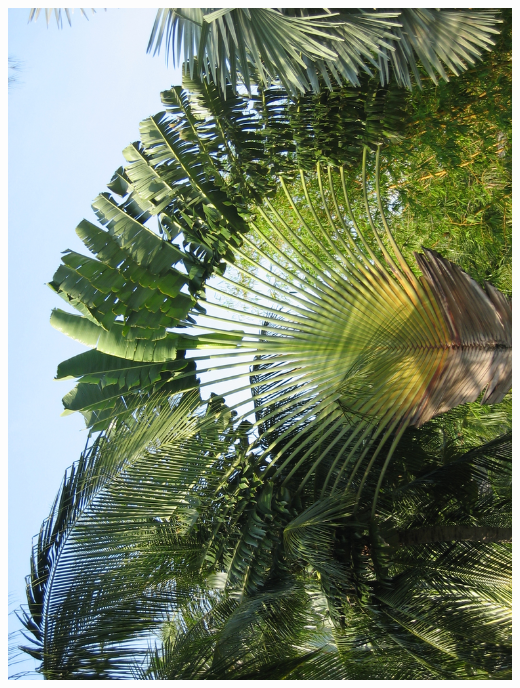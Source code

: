 \newpage\vspace*{-5cm}
\thispagestyle{empty}
\hspace*{-3.5cm}
\includegraphics[width=15.9cm]{articles/pagesCentrales/IMG_1235.JPG}

